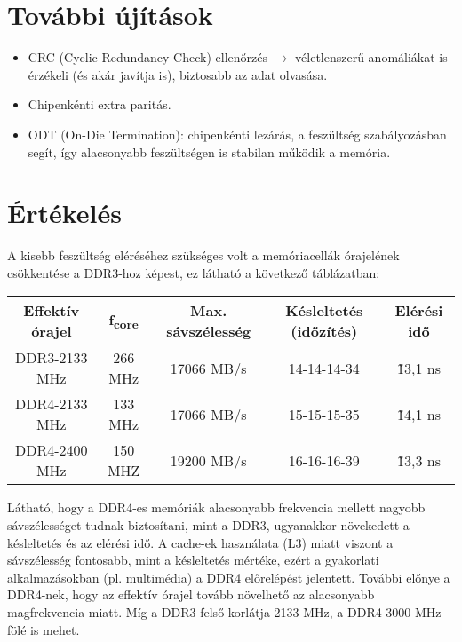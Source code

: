 \section{További újítások}
\begin{itemize}
    \item CRC (Cyclic Redundancy Check) ellenőrzés $\rightarrow$ véletlenszerű anomáliákat is érzékeli (és akár javítja is), biztosabb az adat olvasása.
    \item Chipenkénti extra paritás.
    \item ODT (On-Die Termination): chipenkénti lezárás, a feszültség szabályozásban segít, így alacsonyabb feszültségen is stabilan működik a memória.
\end{itemize}

\section{Értékelés}
A kisebb feszültség eléréséhez szükséges volt a memóriacellák órajelének csökkentése a DDR3-hoz képest, ez látható a következő táblázatban:
\begin{center}
    \begin{tabular}{c | c | c | c | c}
        Effektív órajel & f\textsubscript{core} & Max. sávszélesség & Késleltetés (időzítés) & Elérési idő \\
        \hline
        DDR3-2133 MHz & 266 MHz & 17066 MB/s & 14-14-14-34 & \~13,1 ns \\
        \hline
        DDR4-2133 MHz & 133 MHz & 17066 MB/s & 15-15-15-35 & \~14,1 ns \\
        \hline
        DDR4-2400 MHz & 150 MHZ & 19200 MB/s & 16-16-16-39 & \~13,3 ns \\
    \end{tabular}
\end{center}
Látható, hogy a DDR4-es memóriák alacsonyabb frekvencia mellett nagyobb sávszélességet tudnak biztosítani, mint a DDR3, ugyanakkor növekedett a késleltetés és az elérési idő.
A cache-ek használata (L3) miatt viszont a sávszélesség fontosabb, mint a késleltetés mértéke, ezért a gyakorlati alkalmazásokban (pl. multimédia) a DDR4 előrelépést jelentett.
További előnye a DDR4-nek, hogy az effektív órajel tovább növelhető az alacsonyabb magfrekvencia miatt.
Míg a DDR3 felső korlátja 2133 MHz, a DDR4 3000 MHz fölé is mehet.